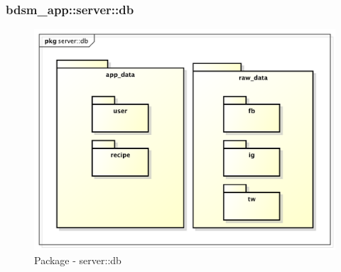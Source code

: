 

\subsubsection{bdsm\_app::server::db} %
\label{ssub:bdsm_app_server_db}

	\begin{figure}[htbp]
		\centering
		\centerline{\includegraphics[scale=0.5]{./images/server/db.pdf}}
		\caption{Package - server::db}
	\end{figure}


